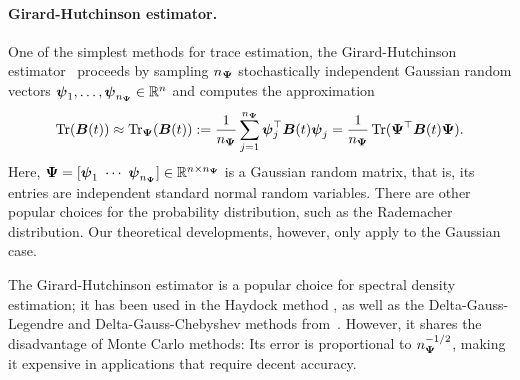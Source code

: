 \paragraph{Girard-Hutchinson estimator.} One of the simplest methods for trace estimation, the Girard-Hutchinson estimator~\cite{girard-1989-fast-montecarlo,hutchinson-1990-stochastic-estimator} proceeds by sampling $n_{\boldsymbol{\Psi}}$ stochastically independent Gaussian random vectors $\boldsymbol{\psi}_1,\dots, \boldsymbol{\psi}_{n_{\boldsymbol{\Psi}}} \in \mathbb{R}^{n}$
and computes the approximation 
\begin{equation}
    \operatorname{Tr}(\boldsymbol{B}(t)) \approx \operatorname{Tr}_{\boldsymbol{\Psi}}(\boldsymbol{B}(t))
    := \frac{1}{n_{\boldsymbol{\Psi}}} \sum_{j=1}^{n_{\boldsymbol{\Psi}}} \boldsymbol{\psi}_j^{\top} \boldsymbol{B}(t) \boldsymbol{\psi}_j
    = \frac{1}{n_{\boldsymbol{\Psi}}} \operatorname{Tr}( \boldsymbol{\Psi}^{\top} \boldsymbol{B}(t) \boldsymbol{\Psi}).
    \label{equ:hutchinson-trace-estimator}
\end{equation}
Here, $\boldsymbol{\Psi} = [\boldsymbol{\psi}_1 ~ \cdots ~ \boldsymbol{\psi}_{n_{\boldsymbol{\Psi}}}] \in \mathbb{R}^{n \times n_{\boldsymbol{\Psi}}}$ is a Gaussian random matrix, that is, 
its entries are independent standard normal random variables.
There are other popular choices for the probability distribution, such as the Rademacher distribution. Our theoretical developments, however, only apply to the Gaussian case.

The Girard-Hutchinson estimator is a popular choice for spectral density estimation; it has been used in the Haydock method \cite{haydock-1972-electronic-structure}, as well as the Delta-Gauss-Legendre and Delta-Gauss-Chebyshev methods from~\cite{lin-2016-approximating-spectral, lin-2017-randomized-estimation}. However, it shares the disadvantage of Monte Carlo methods: Its error is proportional to $n^{-1/2}_{\boldsymbol{\Psi}}$, making it expensive in applications that require decent accuracy.

